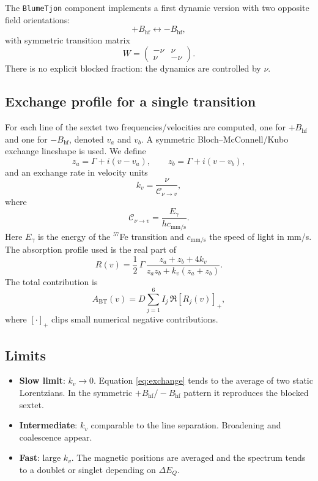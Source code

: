 \documentclass[11pt,a4paper]{article}
\newcommand{\BHF}{B_{\mathrm{hf}}}
\newcommand{\dEQ}{\Delta E_Q}
\newcommand{\code}[1]{\texttt{\small #1}}
\begin{document}
The \code{BlumeTjon} component implements a first dynamic version with two
opposite field orientations:
\begin{equation}
  +\BHF \leftrightarrow -\BHF,
\end{equation}
with symmetric transition matrix
\begin{equation}
  W=\begin{pmatrix}-\nu & \nu\\ \nu & -\nu\end{pmatrix}.
\end{equation}
There is no explicit blocked fraction: the dynamics are controlled by $\nu$.

\subsection{Exchange profile for a single transition}

For each line of the sextet two frequencies/velocities are computed, one for
$+\BHF$ and one for $-\BHF$, denoted $v_a$ and $v_b$. A symmetric
Bloch--McConnell/Kubo exchange lineshape is used. We define
\begin{equation}
  z_a = \Gamma + i(v-v_a),\qquad z_b = \Gamma + i(v-v_b),
\end{equation}
and an exchange rate in velocity units
\begin{equation}
  k_v = \frac{\nu}{\mathcal{C}_{\nu\to v}},
\end{equation}
where
\begin{equation}
  \mathcal{C}_{\nu\to v}=\frac{E_\gamma}{h c_{\mathrm{mm/s}}}.
\end{equation}
Here $E_\gamma$ is the energy of the $^{57}$Fe transition and
$c_{\mathrm{mm/s}}$ the speed of light in mm/s. The absorption profile used
is the real part of
\begin{equation}
  R(v)=\frac{1}{2}\,\Gamma\,
  \frac{z_a+z_b+4k_v}{z_a z_b+k_v(z_a+z_b)}.
  \label{eq:exchange}
\end{equation}
The total contribution is
\begin{equation}
  A_{\mathrm{BT}}(v)=D\sum_{j=1}^{6} I_j\,\Re\left[R_j(v)\right]_+,
\end{equation}
where $[\cdot]_+$ clips small numerical negative contributions.

\subsection{Limits}

\begin{itemize}[leftmargin=*]
  \item \textbf{Slow limit}: $k_v\to0$. Equation \eqref{eq:exchange}
  tends to the average of two static Lorentzians. In the symmetric
  $+\BHF/-\BHF$ pattern it reproduces the blocked sextet.
  \item \textbf{Intermediate}: $k_v$ comparable to the line separation.
  Broadening and coalescence appear.
  \item \textbf{Fast}: large $k_v$. The magnetic positions are averaged and
  the spectrum tends to a doublet or singlet depending on $\dEQ$.
\end{itemize}
\end{document}
